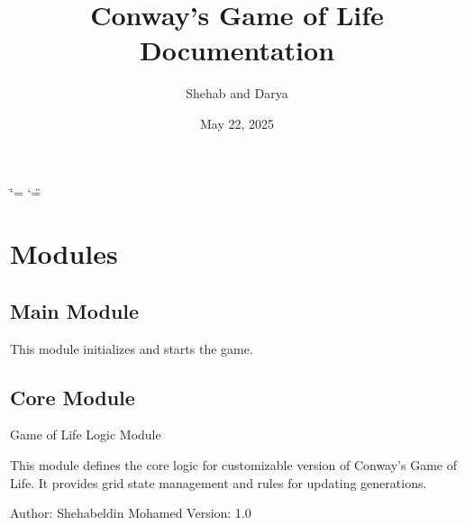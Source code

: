 \documentclass[letterpaper,10pt,oneside,english]{sphinxhowto}
\title{Conway's Game of Life Documentation}
\date{May 22, 2025}
\author{Shehab and Darya}
\begin{document}
\ifdefined\shorthandoff
  \ifnum\catcode`\=\string=\active\shorthandoff{=}\fi
  \ifnum\catcode`\"=\active{}\fi
\fi

\pagestyle{empty}
\sphinxmaketitle
\pagestyle{plain}
\sphinxtableofcontents
\pagestyle{normal}
\label{\detokenize{index::doc}}


\clearpage


\section{Modules}
\label{\detokenize{index:modules}}
\sphinxstepscope


\subsection{Main Module}
\label{\detokenize{main:main-module}}\label{\detokenize{main::doc}}
\sphinxAtStartPar
This module initializes and starts the game.
\label{\detokenize{main:module-main}}
\sphinxstepscope


\subsection{Core Module}
\label{\detokenize{core:module-core.game_of_life}}\label{\detokenize{core:core-module}}\label{\detokenize{core::doc}}
\sphinxAtStartPar
Game of Life Logic Module

\sphinxAtStartPar
This module defines the core logic for customizable version of Conway’s Game of Life.
It provides grid state management and rules for updating generations.

\sphinxAtStartPar
Author: Shehabeldin Mohamed
Version: 1.0
\end{document}

